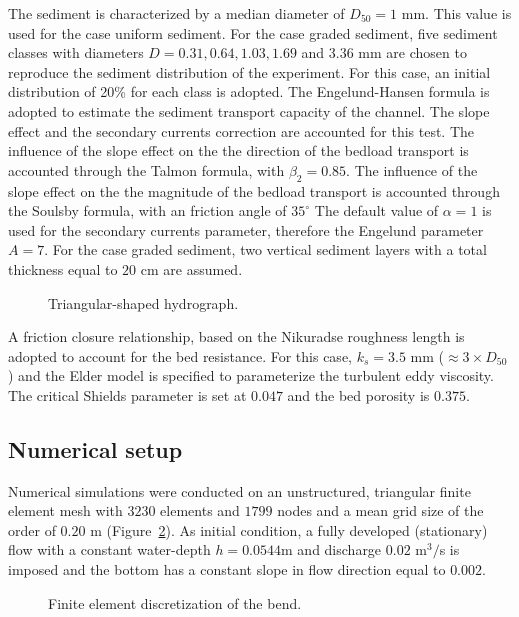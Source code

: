 The sediment is characterized by a median diameter of $D_{50}=1$ mm. This value is used for the case uniform sediment. For the case graded sediment, five sediment classes with diameters $D=0.31, 0.64, 1.03, 1.69$ and $3.36$ mm are chosen to reproduce the sediment distribution of the experiment. For this case, an initial distribution of 20\% for each class is adopted.
 The Engelund-Hansen formula is adopted to estimate the sediment transport capacity of the channel. The slope effect and the secondary currents correction are accounted for this test. The influence of the slope effect on the the direction of the bedload transport is accounted through the Talmon formula, with $\beta_2=0.85$. The influence of the slope effect on the the magnitude of the bedload transport is accounted through the Soulsby formula, with an friction angle of $35^{\circ}$
The default value of $\alpha=1$ is used for the secondary currents parameter, therefore the Engelund parameter $A=7$.
For the case graded sediment, two vertical sediment layers with a total thickness equal to $20$ cm are assumed.

\begin{figure}[!h]
\centering
{}
 \caption{Triangular-shaped hydrograph.}\label{fig:hydro}
\end{figure}

A friction closure relationship, based on the Nikuradse roughness length is adopted to
account for the bed resistance. For this case, $k_s=3.5$ mm ($\approx 3\times D_{50}$) and the Elder model is specified to parameterize the turbulent eddy viscosity.
The critical Shields parameter is set at $0.047$ and the bed porosity is $0.375$.


%
%
\subsection{Numerical setup}
%
Numerical simulations were conducted on an unstructured, triangular finite element mesh with
$3230$ elements and $1799$ nodes and a mean grid size of the order of $0.20$ m (Figure~\ref{fig:mesh}).
As initial condition, a fully developed (stationary) flow with a constant water-depth $h = 0.0544$m and discharge $0.02$ m$^3/$s is imposed and the bottom has a constant slope in flow direction equal to $0.002$.

\begin{figure} [!h]
\centering
{}
 \caption{Finite element discretization of the bend.}\label{fig:mesh}
\end{figure}

